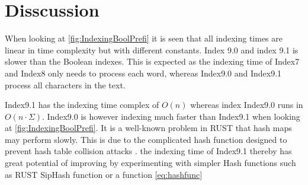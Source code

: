 \section{Disscussion}
When looking at \ref{fig:IndexingBoolPrefi} it is seen that all indexing times are linear in time complexity but with different constants. Index 9.0 and index 9.1 is slower than the Boolean indexes. This is expected as the indexing time of Index7 and Index8 only needs to process each word, whereas Index9.0 and Index9.1 process all characters in the text.

Index9.1 has the indexing time complex of $O(n)$ whereas index Index9.0 runs in $O(n\cdot \Sigma)$. Index9.0 is however indexing much faster than Index9.1 when looking at \ref{fig:IndexingBoolPrefi}. It is a well-known problem in RUST that hash maps may perform slowly. This is due to the complicated hash function designed to prevent hash table collision attacks \cite{FAQ}. the indexing time of Index9.1 thereby has great potential of improving by experimenting with simpler Hash functions such as RUST SipHash function or a function \ref{eq:hashfunc}  